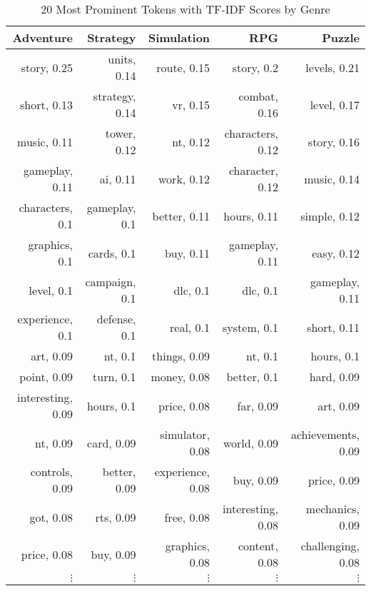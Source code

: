 \begin{table}[h]
    \centering
    \begin{tabular}{r|r|r|r|r}
        Adventure & Strategy & Simulation & RPG & Puzzle \\
        \hline
        story,  0.25  & units,  0.14  & route,  0.15  & story,  0.2  & levels,  0.21  \\
        short,  0.13  & strategy,  0.14  & vr,  0.15  & combat,  0.16  & level,  0.17  \\
        music,  0.11  & tower,  0.12  & nt,  0.12  & characters,  0.12  & story,  0.16  \\
        gameplay,  0.11  & ai,  0.11  & work,  0.12  & character,  0.12  & music,  0.14  \\
        characters,  0.1  & gameplay,  0.1  & better,  0.11  & hours,  0.11  & simple,  0.12  \\
        graphics,  0.1  & cards,  0.1  & buy,  0.11  & gameplay,  0.11  & easy,  0.12  \\
        level,  0.1  & campaign,  0.1  & dlc,  0.1  & dlc,  0.1  & gameplay,  0.11  \\
        experience,  0.1  & defense,  0.1  & real,  0.1  & system,  0.1  & short,  0.11  \\
        art,  0.09  & nt,  0.1  & things,  0.09  & nt,  0.1  & hours,  0.1  \\
        point,  0.09  & turn,  0.1  & money,  0.08  & better,  0.1  & hard,  0.09  \\
        interesting, 0.09 & hours, 0.1 & price, 0.08 & far, 0.09 & art, 0.09 \\
        nt, 0.09 & card, 0.09 & simulator, 0.08 & world, 0.09 & achievements, 0.09 \\
        controls, 0.09 & better, 0.09 & experience, 0.08 & buy, 0.09 & price, 0.09 \\
        got, 0.08 & rts, 0.09 & free, 0.08 & interesting, 0.08 & mechanics, 0.09 \\
        price, 0.08 & buy, 0.09 & graphics, 0.08 & content, 0.08 & challenging, 0.08 \\
        $\vdots$ & $\vdots$ & $\vdots$ & $\vdots$ & $\vdots$
    \end{tabular}
    \caption{20 Most Prominent Tokens with TF-IDF Scores by Genre}
    \label{tab:top_tokens_by_genre}
\end{table}